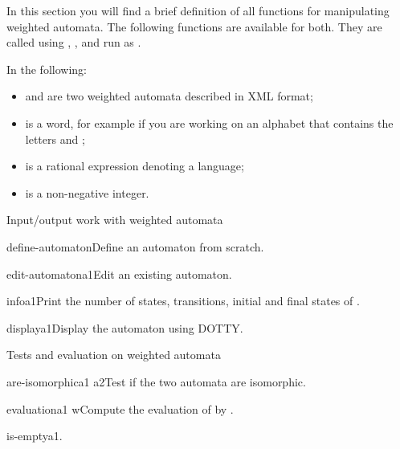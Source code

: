 In this section you will find a brief definition of all functions for
manipulating weighted automata. The following functions are available
for both.  They are called using ,
, and  run as
.

\smallskip

In the following:

\begin{itemize}
\item {} and  are two weighted automata described in
  \Vauc XML format;
\item {} is a word, for example  if you are working on
  an alphabet that contains the letters  and ;
\item {} is a rational expression denoting a language;
\item {} is a non-negative integer.
\end{itemize}


\begin{fnsection}{Input/output work with weighted automata}
\item{define-automaton}{}{Define an automaton from scratch.}
\item{edit-automaton}{a1}{Edit an existing automaton.}
\item{info}{a1}{Print the number of states, transitions, initial and
    final states of .}
\item{display}{a1}{Display the automaton using DOTTY.}  \hline
\end{fnsection}

\begin{fnsection}{Tests and evaluation on weighted automata}
\item{are-isomorphic}{a1 a2}{Test if the two automata are isomorphic.}
\item{evaluation}{a1 w}{Compute the evaluation of  by
    .}
\item{is-empty}{a1}{.}  \hline
\end{fnsection}

